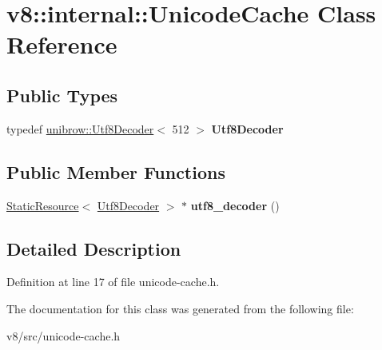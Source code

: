 \hypertarget{classv8_1_1internal_1_1UnicodeCache}{}\section{v8\+:\+:internal\+:\+:Unicode\+Cache Class Reference}
\label{classv8_1_1internal_1_1UnicodeCache}
\subsection*{Public Types}
\begin{DoxyCompactItemize}
\item 
\mbox{\label{classv8_1_1internal_1_1UnicodeCache_a23782170a48d31306dacf9ea0596bf05}} 
typedef \mbox{\hyperlink{classunibrow_1_1Utf8Decoder}{unibrow\+::\+Utf8\+Decoder}}$<$ 512 $>$ {\bfseries Utf8\+Decoder}
\end{DoxyCompactItemize}
\subsection*{Public Member Functions}
\begin{DoxyCompactItemize}
\item 
\mbox{\label{classv8_1_1internal_1_1UnicodeCache_a7cb5b1e10aabf0f2cfeb19ea98d21ef5}} 
\mbox{\hyperlink{classv8_1_1internal_1_1StaticResource}{Static\+Resource}}$<$ \mbox{\hyperlink{classunibrow_1_1Utf8Decoder}{Utf8\+Decoder}} $>$ $\ast$ {\bfseries utf8\+\_\+decoder} ()
\end{DoxyCompactItemize}


\subsection{Detailed Description}


Definition at line 17 of file unicode-\/cache.\+h.



The documentation for this class was generated from the following file\+:\begin{DoxyCompactItemize}
\item 
v8/src/unicode-\/cache.\+h\end{DoxyCompactItemize}
